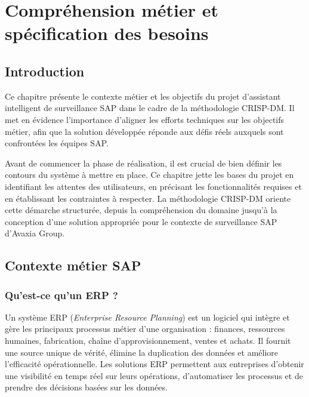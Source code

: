
\chapter{Compréhension métier et spécification des besoins}
\label{chap:business_understanding}

\section*{Introduction}

Ce chapitre présente le contexte métier et les objectifs du projet d'assistant
intelligent de surveillance SAP dans le cadre de la méthodologie CRISP-DM. Il met en
évidence l'importance d'aligner les efforts techniques sur les objectifs métier, afin
que la solution développée réponde aux défis réels auxquels sont confrontées les équipes SAP.

Avant de commencer la phase de réalisation, il est crucial de bien définir les contours du système à mettre en place. Ce chapitre jette les bases du projet en identifiant les attentes des utilisateurs, en précisant les fonctionnalités requises et en établissant les contraintes à respecter. La méthodologie CRISP-DM oriente cette démarche structurée, depuis la compréhension du domaine jusqu'à la conception d'une solution appropriée pour le contexte de surveillance SAP d'Avaxia Group.

\section{Contexte métier SAP}
\label{sec:contexte_sap}

\subsection{Qu'est-ce qu'un ERP ?}

Un système ERP (\textit{Enterprise Resource Planning}) est un logiciel qui intègre et
gère les principaux processus métier d'une organisation : finances, ressources humaines,
fabrication, chaîne d'approvisionnement, ventes et achats. Il fournit une source unique
de vérité, élimine la duplication des données et améliore l'efficacité opérationnelle.
Les solutions ERP permettent aux entreprises d'obtenir une visibilité en temps réel sur
leurs opérations, d'automatiser les processus et de prendre des décisions basées sur
les données.

